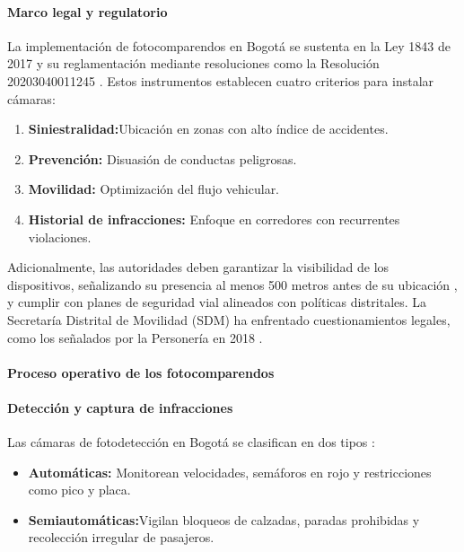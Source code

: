 \paragraph{Marco legal y regulatorio} La implementación de fotocomparendos en Bogotá se sustenta en la Ley 1843 de 2017 \parencite{ley1843} y su reglamentación mediante resoluciones como la Resolución 20203040011245 \parencite{resolucion11245}. Estos instrumentos establecen cuatro criterios para instalar cámaras: 

\begin{enumerate}
    \item \textbf{Siniestralidad:}Ubicación en zonas con alto índice de accidentes. 
    \item \textbf{Prevención:} Disuasión de conductas peligrosas. 
    \item \textbf{Movilidad: } Optimización del flujo vehicular.
        \item \textbf{Historial de infracciones:} Enfoque en corredores con recurrentes violaciones.
\end{enumerate}

Adicionalmente, las autoridades deben garantizar la visibilidad de los dispositivos, señalizando su presencia al menos 500 metros antes de su ubicación \parencite{ley1843}, y cumplir con planes de seguridad vial alineados con políticas distritales. La Secretaría Distrital de Movilidad (SDM) ha enfrentado cuestionamientos legales, como los señalados por la Personería en 2018 \parencite{sdm_camaras2023}.

\paragraph{Proceso operativo de los fotocomparendos}
\paragraph{Detección y captura de infracciones}
Las cámaras de fotodetección en Bogotá se clasifican en dos tipos \parencite{supertransporte2021, mintransporte2023}: 

\begin{itemize}
    \item \textbf{Automáticas: }Monitorean velocidades, semáforos en rojo y restricciones como pico y placa.
    \item \textbf{Semiautomáticas:}Vigilan bloqueos de calzadas, paradas prohibidas y recolección irregular de pasajeros.
\end{itemize}

